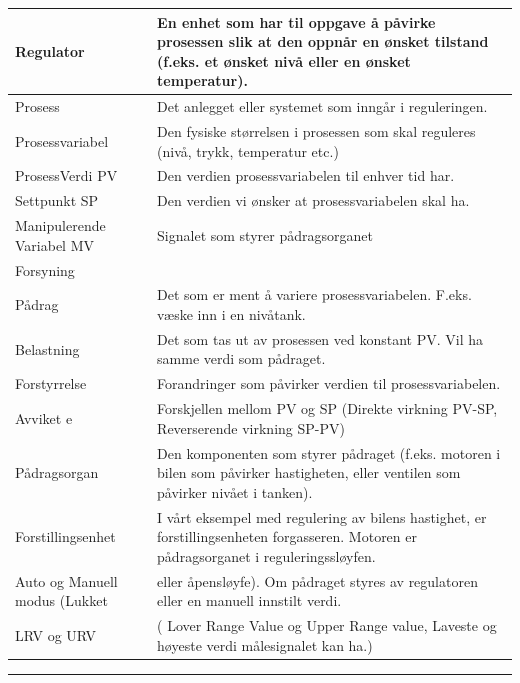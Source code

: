 \documentclass[10pt,a5paper]{article}
\begin{document}
\begin{center}
\begin{longtable}{ | m{2cm} | m{7cm} | }
Regulator & En enhet som har til oppgave å påvirke prosessen slik at den oppnår en ønsket tilstand (f.eks. et ønsket nivå eller en ønsket temperatur).\\
	\hline
Prosess & Det anlegget eller systemet som inngår i reguleringen.\\
	\hline
Prosessvariabel & Den fysiske størrelsen i prosessen som skal reguleres (nivå, trykk, temperatur etc.)\\
	\hline
ProsessVerdi PV & Den verdien prosessvariabelen til enhver tid har.\\
	\hline
Settpunkt SP & Den verdien vi ønsker at prosessvariabelen skal ha.\\
	\hline
Manipulerende Variabel MV & Signalet som styrer pådragsorganet\\
	\hline
Forsyning & \\
	\hline
Pådrag & Det som er ment å variere prosessvariabelen. F.eks. væske inn i en nivåtank. \\
	\hline
Belastning & Det som tas ut av prosessen ved konstant PV. Vil ha samme verdi som pådraget. \\
	\hline
Forstyrrelse & Forandringer som påvirker verdien til prosessvariabelen. \\
	\hline
Avviket e & Forskjellen mellom PV og SP (Direkte virkning PV-SP, Reverserende virkning SP-PV)\\
	\hline
Pådragsorgan & Den komponenten som styrer pådraget (f.eks. motoren i bilen som påvirker hastigheten, eller ventilen som påvirker nivået i tanken).\\
	\hline
Forstillingsenhet & I vårt eksempel med regulering av bilens hastighet, er forstillingsenheten forgasseren. Motoren er pådragsorganet i reguleringssløyfen.\\
	\hline
Auto og Manuell modus (Lukket& eller åpensløyfe). Om pådraget styres av regulatoren eller en manuell innstilt verdi. \\
	\hline
LRV og URV& ( Lover Range Value og Upper Range value, Laveste og høyeste verdi målesignalet kan ha.)\\

	\hline


\end{longtable}
\end{center}
\vskip 5pt
\hrule

\vskip 5pt
\end{document}
